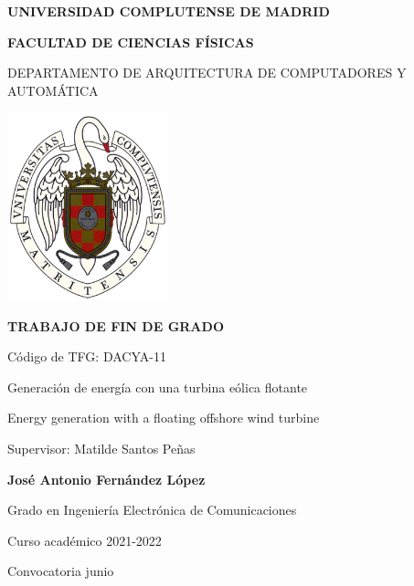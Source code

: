 
\begin{titlepage}
\centering
{ \bfseries \Large UNIVERSIDAD COMPLUTENSE DE MADRID}
\vspace{0.5cm}

{\bfseries  \Large FACULTAD DE CIENCIAS FÍSICAS} 
\vspace{1cm}

{\large DEPARTAMENTO DE ARQUITECTURA DE COMPUTADORES Y AUTOMÁTICA}
\vspace{0.8cm}

{\includegraphics[width=0.35\textwidth]{images/logo_UCM}} %
\vspace{0.8cm}

{\bfseries \Large TRABAJO DE FIN DE GRADO}
\vspace{2cm}

{\Large Código de TFG:  DACYA-11 } \vspace{5mm}

{\Large Generación de energía con una turbina eólica flotante}\vspace{5mm}

{\Large Energy generation with a floating offshore wind turbine}\vspace{5mm}

{\Large Supervisor: Matilde Santos Peñas}\vspace{20mm} 

{\bfseries \LARGE José Antonio Fernández López}\vspace{5mm} 

{\large Grado en Ingeniería Electrónica de Comunicaciones}\vspace{5mm} 

{\large Curso académico 2021-2022}\vspace{5mm} 

{\large Convocatoria junio}\vspace{5mm} 

\end{titlepage}

